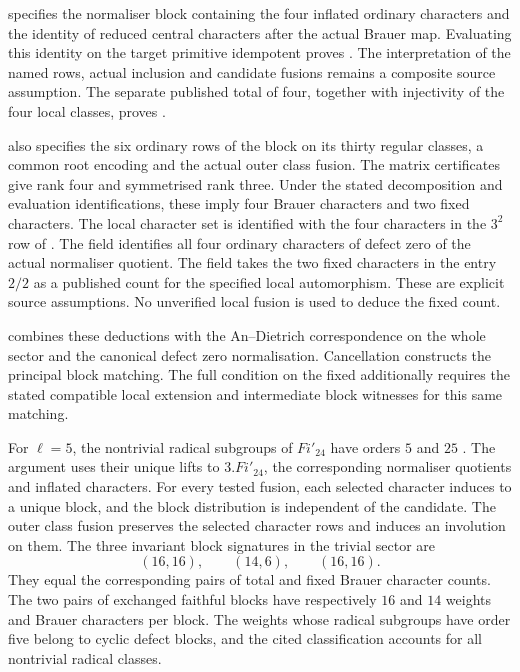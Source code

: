 \begin{implementation}
specifies the normaliser block containing the four inflated
ordinary characters and the identity of reduced central characters
after the actual Brauer map. Evaluating this identity on the
target primitive idempotent proves .
The interpretation of the named rows, actual inclusion and
candidate fusions remains a composite source assumption.
The separate published total of four, together with injectivity
of the four local classes, proves .

 also
specifies the six ordinary rows of the block on its thirty
regular classes, a common root encoding and the actual outer
class fusion. The matrix certificates give rank four
and symmetrised rank three. Under the stated decomposition and
evaluation identifications, these imply four Brauer characters
and two fixed characters. The local character set is identified with
the four characters in the $3^2$ row of
\cite[Table~8]{AnDietrich2012}. The field 
identifies all four ordinary characters of defect zero of the actual
normaliser quotient. The field  takes the two fixed
characters in the entry $2/2$ as a published count for the specified
local automorphism. These are explicit source assumptions. No
unverified local fusion is used to deduce the fixed count.

 combines these deductions with
the An--Dietrich correspondence on the whole sector and the canonical
defect zero normalisation. Cancellation constructs the principal
block matching. The full condition on the fixed  additionally
requires the stated compatible local extension and intermediate block
witnesses for this same matching.
\end{implementation}

For $\ell=5$, the nontrivial radical subgroups of $Fi'_{24}$ have orders
$5$ and $25$ \cite[Proposition~4.1 and Table~1]
{AnCannonOBrienUngerFi24}. The argument uses their unique lifts to
$3.Fi'_{24}$, the corresponding normaliser quotients and inflated characters. For every
tested fusion, each selected character induces to a unique block,
and the block distribution is independent of the candidate.
The outer class fusion preserves the selected character rows and induces an
involution on them. The three invariant block
signatures in the trivial sector are
\[
 (16,16),\qquad(14,6),\qquad(16,16).
\]
They equal the corresponding pairs of total and fixed Brauer character counts. The two pairs
of exchanged faithful blocks have respectively $16$ and $14$
weights and Brauer characters per block. The weights whose radical subgroups have order five belong to cyclic defect blocks, and the cited classification
accounts for all nontrivial radical classes.

